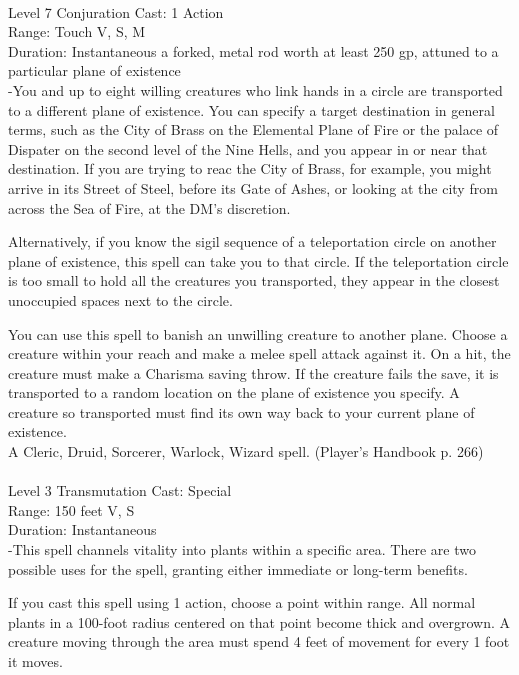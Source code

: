 \documentclass[10pt,twocolumn]{report}
\begin{document}
 \\
Level 7 \quad Conjuration \quad Cast: 1 Action\\
Range: Touch \quad V, S, M\\
Duration: Instantaneous \quad a forked, metal rod worth at least 250 gp, attuned to a particular plane of existence\\
-You and up to eight willing creatures who link hands in a circle are transported to a different plane of existence. You can specify a target destination in general terms, such as the City of Brass on the Elemental Plane of Fire or the palace of Dispater on the second level of the Nine Hells, and you appear in or near that destination. If you are trying to reac the City of Brass, for example, you might arrive in its Street of Steel, before its Gate of Ashes, or looking at the city from across the Sea of Fire, at the DM’s discretion.

Alternatively, if you know the sigil sequence of a teleportation circle on another plane of existence, this spell can take you to that circle. If the teleportation circle is too small to hold all the creatures you transported, they appear in the closest unoccupied spaces next to the circle.

You can use this spell to banish an unwilling creature to another plane. Choose a creature within your reach and make a melee spell attack against it. On a hit, the creature must make a Charisma saving throw. If the creature fails the save, it is transported to a random location on the plane of existence you specify. A creature so transported must find its own way back to your current plane of existence.\\
A Cleric, Druid, Sorcerer, Warlock, Wizard spell. (Player's Handbook p. 266) \\


 \\
Level 3 \quad Transmutation \quad Cast: Special\\
Range: 150 feet \quad V, S\\
Duration: Instantaneous \quad \\
-This spell channels vitality into plants within a specific area. There are two possible uses for the spell, granting either immediate or long-term benefits.

If you cast this spell using 1 action, choose a point within range. All normal plants in a 100-foot radius centered on that point become thick and overgrown. A creature moving through the area must spend 4 feet of movement for every 1 foot it moves.
\end{document}
